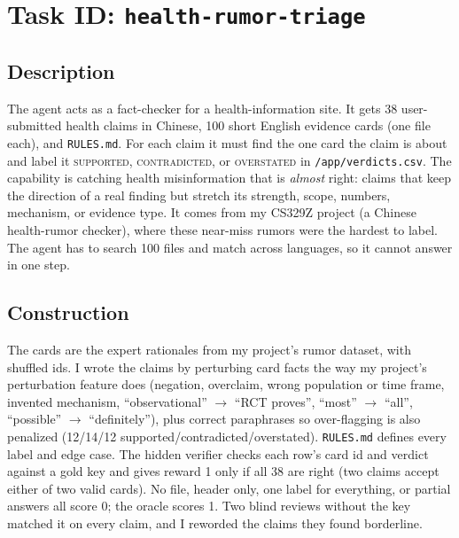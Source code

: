 \documentclass[11pt]{article}
\begin{document}
\small
\setlength{\parskip}{0.35\baselineskip}

\section*{Task ID: \texttt{health-rumor-triage}}

\subsection*{Description}
The agent acts as a fact-checker for a health-information site. It gets 38 user-submitted health claims in
Chinese, 100 short English evidence cards (one file each), and \texttt{RULES.md}. For each claim it must find
the one card the claim is about and label it \textsc{supported}, \textsc{contradicted}, or
\textsc{overstated} in \texttt{/app/verdicts.csv}. The capability is catching health misinformation that is
\emph{almost} right: claims that keep the direction of a real finding but stretch its strength, scope,
numbers, mechanism, or evidence type. It comes from my CS329Z project (a Chinese health-rumor checker), where
these near-miss rumors were the hardest to label. The agent has to search 100 files and match across languages,
so it cannot answer in one step.

\subsection*{Construction}
The cards are the expert rationales from my project's rumor dataset, with shuffled ids. I wrote the claims by
perturbing card facts the way my project's perturbation feature does (negation, overclaim, wrong population or
time frame, invented mechanism, ``observational'' $\to$ ``RCT proves'', ``most'' $\to$ ``all'', ``possible''
$\to$ ``definitely''), plus correct paraphrases so over-flagging is also penalized (12/14/12
supported/contradicted/overstated). \texttt{RULES.md} defines every label and edge case. The hidden verifier
checks each row's card id and verdict against a gold key and gives reward 1 only if all 38 are right (two
claims accept either of two valid cards). No file, header only, one label for everything, or partial answers all
score 0; the oracle scores 1. Two blind reviews without the key matched it on every claim, and I reworded the
claims they found borderline.
\end{document}

